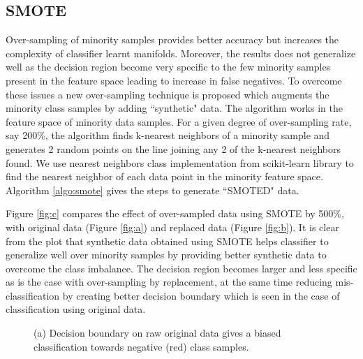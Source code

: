 \documentclass[10pt,journal,compsoc]{IEEEtran}
\begin{document}
\subsection{SMOTE}
Over-sampling of minority samples provides better accuracy but increases the complexity of classifier learnt manifolds. 
Moreover, the results does not generalize well as the decision region become very specific to the few minority samples present in the feature space leading to increase in false negatives.
To overcome these issues a new over-sampling technique is proposed which augments the minority class samples by adding ``synthetic" data.
The algorithm works in the feature space of minority data samples.
For a given degree of over-sampling rate, say 200\%, the algorithm finds k-nearest neighbors of a minority sample and generates 2 random points on the line joining any 2 of the k-nearest neighbors found.
We use nearest neighbors class implementation from scikit-learn library to find the nearest neighbor of each data point in the minority feature space.
Algorithm \ref{algo:smote} gives the steps to generate ``SMOTED" data.

Figure \ref{fig:c} compares the effect of over-sampled data using SMOTE by 500\%, with original data (Figure \ref{fig:a}) and replaced data (Figure \ref{fig:b}).
It is clear from the plot that synthetic data obtained using SMOTE helps classifier to generalize well over minority samples by providing better synthetic data to overcome the class imbalance.
The decision region becomes larger and less specific as is the case with over-sampling by replacement, at the same time reducing mis-classification by creating better decision boundary which is seen in the case of classification using original data.


\begin{figure}[!t]
\centering
{}
\hfil
{}
\hfil
{}
\caption{(a) Decision boundary on raw original data gives a biased classification towards negative (red) class samples.}
\label{fig:compare}
\end{figure}
\end{document}

